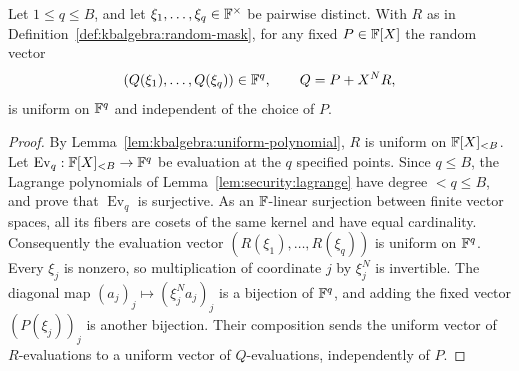 \begin{lemma}\label{lem:kbalgebra:uniform-queries}
Let $1\leq q\leq B$, and let $\xi_1,\ldots,\xi_q\in\mathbb{F}^\times$ be pairwise distinct. With $R$ as in Definition~\ref{def:kbalgebra:random-mask}, for any fixed $P\in\mathbb{F}[X]$ the random vector
\[
 (Q(\xi_1),\ldots,Q(\xi_q))\in\mathbb{F}^q,
 \qquad Q=P+X^N R,
\]
is uniform on $\mathbb{F}^q$ and independent of the choice of $P$.
\end{lemma}
\begin{proof}
By Lemma~\ref{lem:kbalgebra:uniform-polynomial}, $R$ is uniform on $\mathbb{F}[X]_{<B}$. Let $\operatorname{Ev}_q:\mathbb{F}[X]_{<B}\to\mathbb{F}^q$ be evaluation at the $q$ specified points. Since $q\leq B$, the Lagrange polynomials of Lemma~\ref{lem:security:lagrange} have degree $<q\leq B$, and prove that $\operatorname{Ev}_q$ is surjective. As an $\mathbb{F}$-linear surjection between finite vector spaces, all its fibers are cosets of the same kernel and have equal cardinality. Consequently the evaluation vector $(R(\xi_1),\ldots,R(\xi_q))$ is uniform on $\mathbb{F}^q$. Every $\xi_j$ is nonzero, so multiplication of coordinate $j$ by $\xi_j^N$ is invertible. The diagonal map $(a_j)_j\mapsto(\xi_j^Na_j)_j$ is a bijection of $\mathbb{F}^q$, and adding the fixed vector $(P(\xi_j))_j$ is another bijection. Their composition sends the uniform vector of $R$-evaluations to a uniform vector of $Q$-evaluations, independently of $P$.
\end{proof}

